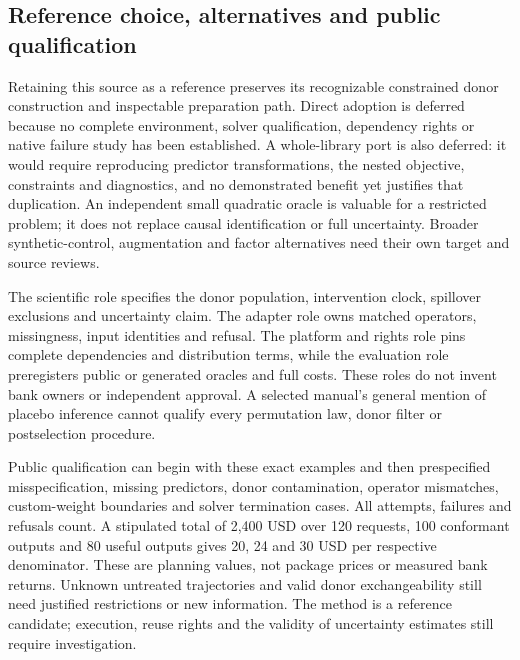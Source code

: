 \subsection{Reference choice, alternatives and public qualification}
Retaining this source as a reference preserves its recognizable constrained
donor construction and inspectable preparation path. Direct adoption is
deferred because no complete environment, solver qualification, dependency
rights or native failure study has been established. A whole-library port
is also deferred: it would require reproducing predictor transformations,
the nested objective, constraints and diagnostics, and no demonstrated
benefit yet justifies that duplication. An independent small quadratic
oracle is valuable for a restricted problem; it does not replace causal
identification or full uncertainty. Broader synthetic-control, augmentation
and factor alternatives need their own target and source reviews.
\citep{exec24_synth_choice}

The scientific role specifies the donor population, intervention clock,
spillover exclusions and uncertainty claim. The adapter role owns matched
operators, missingness, input identities and refusal. The platform and
rights role pins complete dependencies and distribution terms, while the
evaluation role preregisters public or generated oracles and full costs.
These roles do not invent bank owners or independent approval. A selected
manual's general mention of placebo inference cannot qualify every
permutation law, donor filter or postselection procedure.
\citep{exec24_synth_choice,v12_sw_synth}

Public qualification can begin with these exact examples and then
prespecified misspecification, missing predictors, donor contamination,
operator mismatches, custom-weight boundaries and solver termination cases.
All attempts, failures and refusals count. A stipulated total of
2,400 USD over 120 requests, 100 conformant outputs and 80 useful outputs
gives 20, 24 and 30 USD per respective denominator. These are planning
values, not package prices or measured bank returns. Unknown untreated
trajectories and valid donor exchangeability still need justified
restrictions or new information. The method is a reference candidate; execution, reuse rights and the validity of uncertainty estimates still require investigation.
\citep{exec24_synth_choice}
